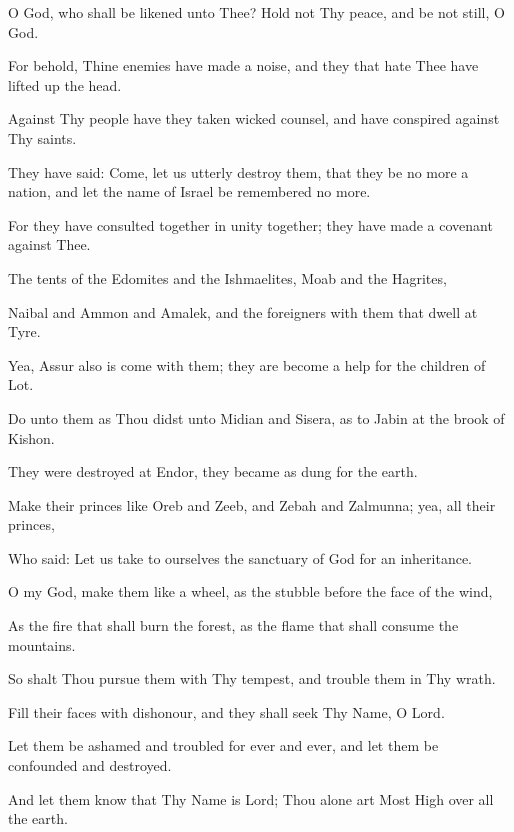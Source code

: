 O God, who shall be likened unto Thee? Hold not Thy peace, and be not still, O God.

For behold, Thine enemies have made a noise, and they that hate Thee have lifted up the head.

Against Thy people have they taken wicked counsel, and have conspired against Thy saints.

They have said: Come, let us utterly destroy them, that they be no more a nation, and let the name of Israel be remembered no more.

For they have consulted together in unity together; they have made a covenant against Thee.

The tents of the Edomites and the Ishmaelites, Moab and the Hagrites,

Naibal and Ammon and Amalek, and the foreigners with them that dwell at Tyre.

Yea, Assur also is come with them; they are become a help for the children of Lot.

Do unto them as Thou didst unto Midian and Sisera, as to Jabin at the brook of Kishon.

They were destroyed at Endor, they became as dung for the earth.

Make their princes like Oreb and Zeeb, and Zebah and Zalmunna; yea, all their princes,

Who said: Let us take to ourselves the sanctuary of God for an inheritance.

O my God, make them like a wheel, as the stubble before the face of the wind,

As the fire that shall burn the forest, as the flame that shall consume the mountains.

So shalt Thou pursue them with Thy tempest, and trouble them in Thy wrath.

Fill their faces with dishonour, and they shall seek Thy Name, O Lord.

Let them be ashamed and troubled for ever and ever, and let them be confounded and destroyed.

And let them know that Thy Name is Lord; Thou alone art Most High over all the earth.
